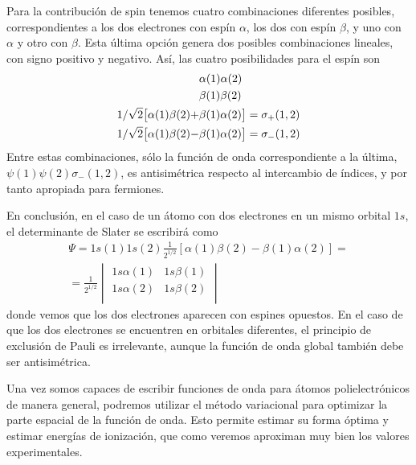 Para la contribución de spin tenemos cuatro combinaciones 
diferentes posibles, correspondientes a los dos electrones 
con espín $\alpha$, los dos con espín $\beta$, y uno con 
$\alpha$ y otro con $\beta$. Esta última opción genera
dos posibles combinaciones lineales, con signo positivo y 
negativo. Así, las cuatro posibilidades para el espín son
\begin{align*}
\small
    &\alpha(1)\alpha(2) \\
    &\beta(1)\beta(2) \\
    1/\sqrt{2}\big[\alpha(1)\beta(2)+&\beta(1)\alpha(2)\big] = \sigma_{+}(1,2)\\
    1/\sqrt{2}\big[\alpha(1)\beta(2)-&\beta(1)\alpha(2)\big] = \sigma_{-}(1,2)
\end{align*}
Entre estas combinaciones, sólo la función de onda 
correspondiente a la última, $\psi(1)\psi(2)\sigma_{-}(1,2)$, 
es antisimétrica respecto al intercambio de índices, y por 
tanto apropiada para fermiones. 

En conclusión, en el caso de un átomo con dos electrones en 
un mismo orbital $1s$, el determinante de Slater se escribirá
como
\begin{equation}
\begin{split}
    \Psi = 1s(1)1s(2)\frac{1}{2^{1/2}}[\alpha(1)\beta(2)-\beta(1)\alpha(2)] = \\
=    \frac{1}{2^{1/2}}
    \begin{vmatrix} 
    1s\alpha(1) & 1s\beta(1)   \\
    1s\alpha(2) & 1s\beta(2)  \\
    \end{vmatrix}
    \end{split}
    \label{eq:fundamental}
\end{equation}
donde vemos que los dos electrones aparecen con espines opuestos. 
En el caso de que los dos electrones se encuentren en
orbitales diferentes, el principio de exclusión de Pauli es 
irrelevante, aunque la función de onda global también debe ser
antisimétrica.

Una vez somos capaces de escribir funciones de onda para
átomos polielectrónicos de manera general, podremos
utilizar el método variacional para optimizar la 
parte espacial de la función de onda. Esto permite 
estimar su forma óptima y estimar energías de ionización,
que como veremos aproximan muy bien los valores
experimentales.

